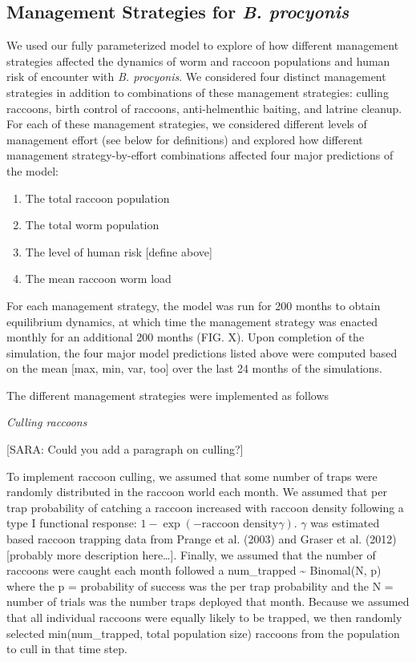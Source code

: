 \documentclass[11pt]{article}
\begin{document}
\subsection{Management Strategies for \emph{B. procyonis}}

We used our fully parameterized model to explore of how different
management strategies affected the dynamics of worm and raccoon
populations and human risk of encounter with \emph{B. procyonis}. We considered four
distinct management strategies in addition to combinations of these
management strategies: culling raccoons, birth control of raccoons,
anti-helmenthic baiting, and latrine cleanup. For each of these
management strategies, we considered different levels of management
effort (see below for definitions) and explored how different management
strategy-by-effort combinations affected four major predictions of the
model: 

\begin{enumerate}
    \item The total raccoon population 
    \item The total worm population
    \item The level of human risk [define above]
    \item The mean raccoon worm load
\end{enumerate}

For each management strategy, the model was run for 200 months to
obtain equilibrium dynamics, at which time the management strategy was
enacted monthly for an additional 200 months (FIG. X). Upon completion
of the simulation, the four major model predictions listed above were
computed based on the mean [max, min, var, too] over the last 24
months of the simulations.

The different management strategies were implemented as follows

\bigskip
\noindent
\emph{Culling raccoons}

[SARA: Could you add a paragraph on culling?]

To implement raccoon culling, we assumed that some number of traps were
randomly distributed in the raccoon world each month. We assumed that
per trap probability of catching a raccoon increased with raccoon
density following a type I functional response: $1 - \exp(-\text{raccoon
density} \gamma)$. $\gamma$ was estimated
based raccoon trapping data from  Prange et al. (2003) and Graser et al.
(2012) {[}probably more description here\ldots{}{]}. Finally, we assumed
that the number of raccoons were caught each month followed a
num\_trapped \textasciitilde{} Binomal(N, p) where the p = probability
of success was the per trap probability and the N = number of trials was
the number traps deployed that month. Because we assumed that all
individual raccoons were equally likely to be trapped, we then randomly
selected min(num\_trapped, total population size) raccoons from the
population to cull in that time step.
\end{document}
